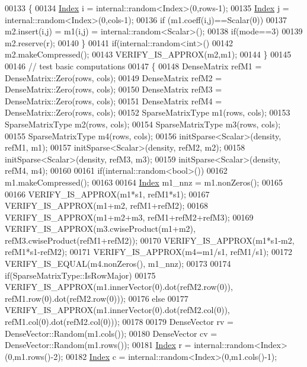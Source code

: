 \begin{DoxyCode}
00133       \{
00134         \hyperlink{namespace_eigen_a62e77e0933482dafde8fe197d9a2cfde}{Index} i = internal::random<Index>(0,rows-1);
00135         \hyperlink{namespace_eigen_a62e77e0933482dafde8fe197d9a2cfde}{Index} j = internal::random<Index>(0,cols-1);
00136         \textcolor{keywordflow}{if} (m1.coeff(i,j)==Scalar(0))
00137           m2.insert(i,j) = m1(i,j) = internal::random<Scalar>();
00138         \textcolor{keywordflow}{if}(mode==3)
00139           m2.reserve(r);
00140       \}
00141       \textcolor{keywordflow}{if}(internal::random<int>()%
00142         m2.makeCompressed();
00143       VERIFY\_IS\_APPROX(m2,m1);
00144     \}
00145 
00146   \textcolor{comment}{// test basic computations}
00147   \{
00148     DenseMatrix refM1 = DenseMatrix::Zero(rows, cols);
00149     DenseMatrix refM2 = DenseMatrix::Zero(rows, cols);
00150     DenseMatrix refM3 = DenseMatrix::Zero(rows, cols);
00151     DenseMatrix refM4 = DenseMatrix::Zero(rows, cols);
00152     SparseMatrixType m1(rows, cols);
00153     SparseMatrixType m2(rows, cols);
00154     SparseMatrixType m3(rows, cols);
00155     SparseMatrixType m4(rows, cols);
00156     initSparse<Scalar>(density, refM1, m1);
00157     initSparse<Scalar>(density, refM2, m2);
00158     initSparse<Scalar>(density, refM3, m3);
00159     initSparse<Scalar>(density, refM4, m4);
00160 
00161     \textcolor{keywordflow}{if}(internal::random<bool>())
00162       m1.makeCompressed();
00163 
00164     \hyperlink{namespace_eigen_a62e77e0933482dafde8fe197d9a2cfde}{Index} m1\_nnz = m1.nonZeros();
00165 
00166     VERIFY\_IS\_APPROX(m1*s1, refM1*s1);
00167     VERIFY\_IS\_APPROX(m1+m2, refM1+refM2);
00168     VERIFY\_IS\_APPROX(m1+m2+m3, refM1+refM2+refM3);
00169     VERIFY\_IS\_APPROX(m3.cwiseProduct(m1+m2), refM3.cwiseProduct(refM1+refM2));
00170     VERIFY\_IS\_APPROX(m1*s1-m2, refM1*s1-refM2);
00171     VERIFY\_IS\_APPROX(m4=m1/s1, refM1/s1);
00172     VERIFY\_IS\_EQUAL(m4.nonZeros(), m1\_nnz);
00173 
00174     \textcolor{keywordflow}{if}(SparseMatrixType::IsRowMajor)
00175       VERIFY\_IS\_APPROX(m1.innerVector(0).dot(refM2.row(0)), refM1.row(0).dot(refM2.row(0)));
00176     \textcolor{keywordflow}{else}
00177       VERIFY\_IS\_APPROX(m1.innerVector(0).dot(refM2.col(0)), refM1.col(0).dot(refM2.col(0)));
00178 
00179     DenseVector rv = DenseVector::Random(m1.cols());
00180     DenseVector cv = DenseVector::Random(m1.rows());
00181     \hyperlink{namespace_eigen_a62e77e0933482dafde8fe197d9a2cfde}{Index} r = internal::random<Index>(0,m1.rows()-2);
00182     \hyperlink{namespace_eigen_a62e77e0933482dafde8fe197d9a2cfde}{Index} c = internal::random<Index>(0,m1.cols()-1);

\end{DoxyCode}
